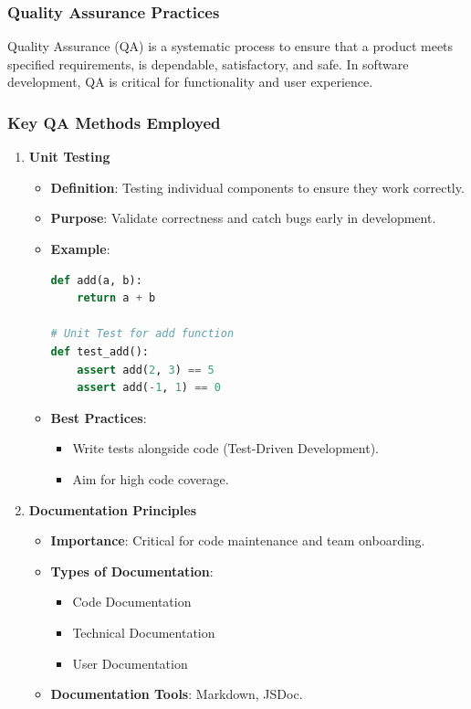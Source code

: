 \documentclass{beamer}
\begin{document}
\begin{frame}
    \frametitle{Quality Assurance Practices}
    Quality Assurance (QA) is a systematic process to ensure that a product meets specified requirements, is dependable, satisfactory, and safe. In software development, QA is critical for functionality and user experience.
\end{frame}

\begin{frame}
    \frametitle{Key QA Methods Employed}
    \begin{enumerate}
        \item \textbf{Unit Testing}
        \begin{itemize}
            \item \textbf{Definition}: Testing individual components to ensure they work correctly.
            \item \textbf{Purpose}: Validate correctness and catch bugs early in development.
            \item \textbf{Example}:
            \begin{lstlisting}[language=Python]
def add(a, b):
    return a + b

# Unit Test for add function
def test_add():
    assert add(2, 3) == 5
    assert add(-1, 1) == 0
            \end{lstlisting}
            \item \textbf{Best Practices}:
            \begin{itemize}
                \item Write tests alongside code (Test-Driven Development).
                \item Aim for high code coverage.
            \end{itemize}
        \end{itemize}

        \item \textbf{Documentation Principles}
        \begin{itemize}
            \item \textbf{Importance}: Critical for code maintenance and team onboarding.
            \item \textbf{Types of Documentation}:
            \begin{itemize}
                \item Code Documentation
                \item Technical Documentation
                \item User Documentation
            \end{itemize}
            \item \textbf{Documentation Tools}: Markdown, JSDoc.
        \end{itemize}
    \end{enumerate}
\end{frame}
\end{document}
